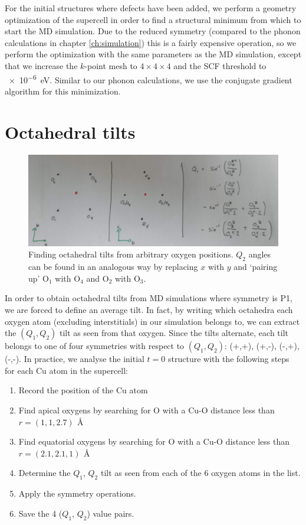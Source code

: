 For the initial structures where defects have been added, we perform a geometry optimization of the supercell in order to find a structural minimum from which to start the MD simulation. Due to the reduced symmetry (compared to the phonon calculations in chapter \ref{ch:simulation}) this is a fairly expensive operation, so we perform the optimization with the same parameters as the MD simulation, except that we increase the $k$-point mesh to $4 \times 4 \times 4$ and the SCF threshold to \SI{e-6}{\eV}. Similar to our phonon calculations, we use the conjugate gradient algorithm for this minimization.

\section{Octahedral tilts}
\begin{figure}
	\centering
	\includegraphics[width=\textwidth]{fig/md/octahedral_tilts_md.jpg}
	\caption[Finding octahedral tilts from arbitrary oxygen positions]{Finding octahedral tilts from arbitrary oxygen positions. $Q_2$ angles can be found in an analogous way by replacing $x$ with $y$ and `pairing up' O$_1$ with O$_4$ and O$_2$ with O$_3$.}
	\label{fig:md_octahedral_tilts}
\end{figure}

In order to obtain octahedral tilts from MD simulations where symmetry is P1, we are forced to define an average tilt. In fact, by writing which octahedra each oxygen atom (excluding interstitials) in our simulation belongs to, we can extract the $(Q_1,Q_2)$ tilt as seen from that oxygen. Since the tilts alternate, each tilt belongs to one of four symmetries with respect to $(Q_1,Q_2)$: (+,+), (+,-), (-,+), (-,-). In practice, we analyse the initial $t=0$ structure with the following steps for each Cu atom in the supercell:

\begin{enumerate}
	\item Record the position of the Cu atom
	\item Find apical oxygens by searching for O with a Cu-O distance less than $r = (1,1,2.7) \, \SI{}{\angstrom}$
	\item Find equatorial oxygens by searching for O with a Cu-O distance less than $r = (2.1,2.1,1) \, \SI{}{\angstrom}$
	\item Determine the $Q_1$, $Q_2$ tilt as seen from each of the 6 oxygen atoms in the list.
	\item Apply the symmetry operations.
	\item Save the 4 ($Q_1$, $Q_2$) value pairs.
\end{enumerate}

